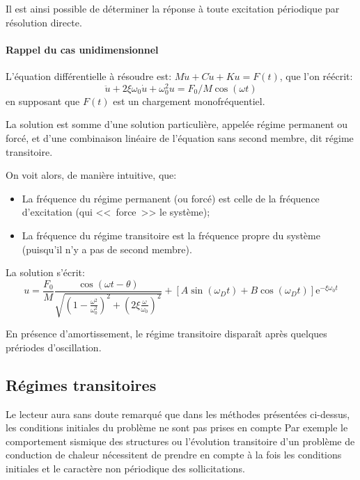 Il est ainsi possible de déterminer la réponse à toute excitation périodique par résolution directe.

\medskip
{}

\medskip
{}
\paragraph{Rappel du cas unidimensionnel}
L'équation différentielle à résoudre est: $M\ddot{u}+C\dot{u}+Ku=F(t)$, que l'on
réécrit: \begin{equation} \ddot{u}+2\xi\omega_0\dot{u}+\omega^2_0 u=F_0/M \cos(\omega t)\end{equation}
en supposant que $F(t)$ est un chargement monofréquentiel.

La solution est somme d'une solution particulière, appelée régime permanent ou forcé, et d'une
combinaison linéaire de l'équation sans second membre, dit régime transitoire.

On voit alors, de manière intuitive, que:
\begin{itemize}%
   \item La fréquence du régime permanent (ou forcé) est celle de la fréquence d'excitation (qui <<~force~>> le système);
   \item La fréquence du régime transitoire est la fréquence propre du système (puisqu'il n'y a pas de second membre).
\end{itemize}
La solution s'écrit:
\begin{equation}
u = \dfrac{F_0}M\dfrac{\cos(\omega t-\theta)}{\sqrt{\left(1-\frac{\omega^2}{\omega_0^2}\right)^2+\left(2\xi\frac{\omega}{\omega_0}\right)^2}}
+\left[A\sin (\omega_D t)+B\cos(\omega_D t)\right] \mathrm{e}^{-\xi\omega_0 t}
\end{equation}

\medskip
En présence d'amortissement, le régime transitoire disparaît après quelques prériodes d'oscillation.






\medskip{}
\subsection{Régimes transitoires}\label{Sec-RT}
Le lecteur aura sans doute remarqué que dans les méthodes présentées ci-dessus,
les conditions initiales du problème ne sont pas prises en compte
Par exemple le comportement sismique des structures ou l'évolution transitoire d'un problème
de conduction de chaleur nécessitent de prendre en compte à la fois les conditions
initiales et le caractère non périodique des sollicitations.

